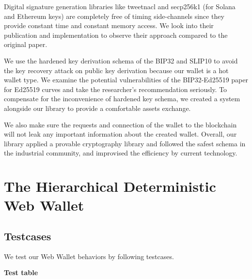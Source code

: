 Digital signature generation libraries like tweetnacl and secp256k1 (for Solana and Ethereum keys) are completely free of timing side-channels since they provide constant time and constant memory access. We look into their publication and implementation to observe their approach compared to the original paper.

We use the hardened key derivation schema of the BIP32 and SLIP10 to avoid the key recovery attack on public key derivation because our wallet is a hot wallet type. We examine the potential vulnerabilities of the BIP32-Ed25519 paper for Ed25519 curves and take the researcher's recommendation seriously. To compensate for the inconvenience of hardened key schema, we created a system alongside our library to provide a comfortable assets exchange.

We also make sure the requests and connection of the wallet to the blockchain will not leak any important information about the created wallet. Overall, our library applied a provable cryptography library and followed the safest schema in the industrial community, and improvised the efficiency by current technology.

\section{The Hierarchical Deterministic Web Wallet}
\label{testhd}
\subsection{Testcases}
We test our Web Wallet behaviors by following testcases.

{\textbf{Test table}}

